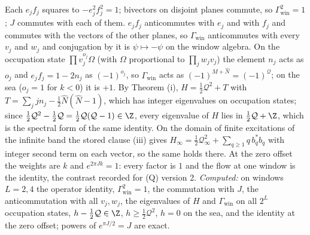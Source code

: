 Each $e_{j}f_{j}$ squares to $-e_{j}^{2}f_{j}^{2} = 1$; bivectors on disjoint planes commute, so $\Gamma_{\mathrm{win}}^{2} = 1$; $J$ commutes with each of them. $e_{j}f_{j}$ anticommutes with $e_{j}$ and with $f_{j}$ and commutes with the vectors of the other planes, so $\Gamma_{\mathrm{win}}$ anticommutes with every $v_{j}$ and $w_{j}$ and conjugation by it is $\psi \mapsto -\psi$ on the window algebra. On the occupation state $\prod v_{j}^{o_{j}}\Omega$ (with $\Omega$ proportional to $\prod_{j}w_{j}v_{j}$) the element $n_{j}$ acts as $o_{j}$ and $e_{j}f_{j} = 1 - 2n_{j}$ as $(-1)^{o_{j}}$, so $\Gamma_{\mathrm{win}}$ acts as $(-1)^{M + \hat N} = (-1)^{\mathcal{Q}}$; on the sea ($o_{j} = 1$ for $k < 0$) it is $+1$. By Theorem (i), $H = \tfrac12\mathcal{Q}^{2} + T$ with $T = \sum_{j}jn_{j} - \tfrac12\hat N(\hat N - 1)$, which has integer eigenvalues on occupation states; since $\tfrac12\mathcal{Q}^{2} - \tfrac12\mathcal{Q} = \tfrac12\mathcal{Q}(\mathcal{Q} - 1) \in \Z$, every eigenvalue of $H$ lies in $\tfrac12\mathcal{Q} + \Z$, which is the spectral form of the same identity. On the domain of finite excitations of the infinite band the stored clause (iii) gives $H_{\infty} = \tfrac12\mathcal{Q}_{\infty}^{2} + \sum_{q \ge 1}q\,b_{q}^{*}b_{q}$ with integer second term on each vector, so the same holds there. At the zero offset the weights are $k$ and $e^{2\pi Jk} = 1$: every factor is $1$ and the flow at one window is the identity, the contrast recorded for (Q) version 2. \emph{Computed:} on windows $L = 2, 4$ the operator identity, $\Gamma_{\mathrm{win}}^{2} = 1$, the commutation with $J$, the anticommutation with all $v_{j}, w_{j}$, the eigenvalues of $H$ and $\Gamma_{\mathrm{win}}$ on all $2^{L}$ occupation states, $h - \tfrac12\mathcal{Q} \in \Z$, $h \ge \tfrac12\mathcal{Q}^{2}$, $h = 0$ on the sea, and the identity at the zero offset; powers of $e^{\pi J/2} = J$ are exact.

